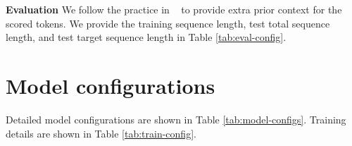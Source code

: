 \documentclass[11pt]{article}
\begin{document}
\noindent \textbf{Evaluation} We follow the practice in ~\cite{knnlm} to provide extra prior context for the scored tokens. We provide the training sequence length, test total sequence length, and test target sequence length in Table \ref{tab:eval-config}. 



\section{Model configurations} \label{appendix:config}

Detailed model configurations are shown in Table \ref{tab:model-configs}.  Training details are shown in Table \ref{tab:train-config}.


















%
 
\end{document}
